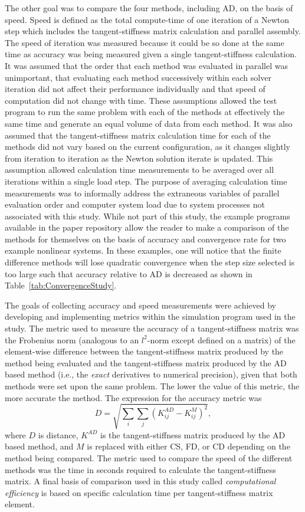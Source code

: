 \documentclass[preprint,12pt]{elsarticle}
\begin{document}
The other goal was to compare the four methods, including AD, on the basis of speed. Speed is defined as the total compute-time of one iteration of a Newton step which includes the tangent-stiffness matrix calculation and parallel assembly.  The speed of iteration was measured because it could be so done at the same time as accuracy was being measured given a single tangent-stiffness calculation.  It was assumed that the order that each method was evaluated in parallel was unimportant, that evaluating each method successively within each solver iteration did not affect their performance individually and that speed of computation did not change with time. These assumptions allowed the test program to run the same problem with each of the methods at effectively the same time and generate an equal volume of data from each method. It was also assumed that the tangent-stiffness matrix calculation time for each of the methods did not vary based on the current configuration, as it changes slightly from iteration to iteration as the Newton solution iterate is updated.  This assumption allowed calculation time measurements to be averaged over all iterations within a single load step. The purpose of averaging calculation time measurements was to informally address the extraneous variables of parallel evaluation order and computer system load due to system processes not associated with this study. While not part of this study, the example programs available in the paper repository allow the reader to make a comparison of the methods for themselves on the basis of accuracy and convergence rate for two example nonlinear systems. In these examples, one will notice that the finite difference methods will lose quadratic convergence when the step size selected is too large such that accuracy relative to AD is decreased as shown in Table~\ref{tab:ConvergenceStudy}.

The goals of collecting accuracy and speed measurements were achieved by developing and implementing metrics within the simulation program used in the study. The metric used to measure the accuracy of a tangent-stiffness matrix was the Frobenius norm (analogous to an $l^2$-norm except defined on a matrix) of the element-wise difference between the tangent-stiffness matrix produced by the method being evaluated and the tangent-stiffness matrix produced by the AD based method (i.e., the \emph{exact} derivatives to numerical precision), given that both methods were set upon the same problem. The lower the value of this metric, the more accurate the method. The expression for the accuracy metric was
%
\begin{equation} 
    D = \sqrt{\sum_i \sum_j(K^{AD}_{ij} - K^{M}_{ij})^2},
    \label{eqn:accuracy} 
\end{equation}
%
where $D$ is distance, $K^{AD}$ is the tangent-stiffness matrix produced by the AD based method, and $M$ is replaced with either CS, FD, or CD depending on the method being compared.  The metric used to compare the speed of the different methods was the time in seconds required to calculate the tangent-stiffness matrix. A final basis of comparison used in this study called \emph{computational efficiency} is based on specific calculation time per tangent-stiffness matrix element.
\end{document}
